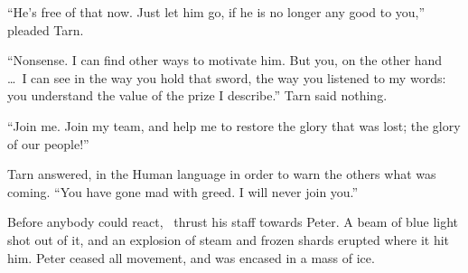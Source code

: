 ``He's free of that now.  Just let him go, if he is no longer any good to you,'' pleaded Tarn.

``Nonsense.  I can find other ways to motivate him.  But you, on the other hand \ldots\ I can see in the way you hold that sword, the way you listened to my words: you understand the value of the prize I describe.''  Tarn said nothing.

``Join me.  Join my team, and help me to restore the glory that was lost; the glory of our people!''

Tarn answered, in the Human language in order to warn the others what was coming.  ``You have gone mad with greed.  I will never join you.''

Before anybody could react, \mothzam\ thrust his staff towards Peter.  A beam of blue light shot out of it, and an explosion of steam and frozen shards erupted where it hit him.  Peter ceased all movement, and was encased in a mass of ice.

